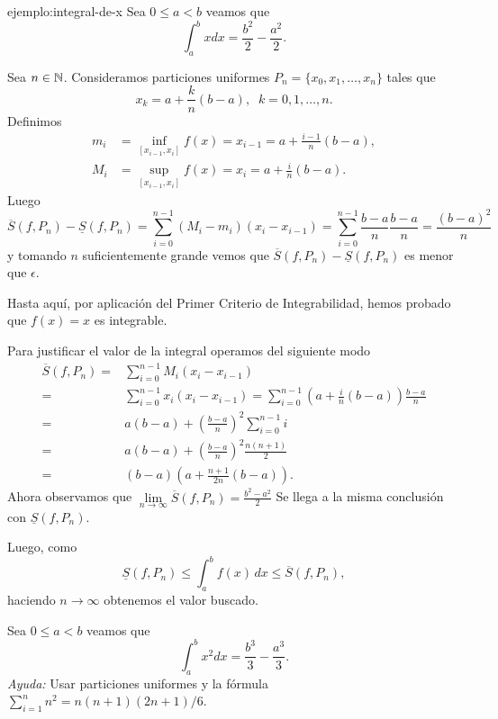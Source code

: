 \begin{ejemplo}{ejemplo:integral-de-x} Sea $0\leq a<b$ veamos que 
\[
 \int_a^b x dx=\frac{b^2}{2}-\frac{a^2}{2}.
\]
\begin{demo}
Sea $n \in \mathbb{N}$.
Consideramos particiones uniformes $P_n=\{x_0,x_1,\ldots,x_n\}$ tales que
\[x_k=a+\frac{k}{n}(b-a),\;\;  k=0,1,\ldots,n.\]
Definimos
\[\begin{split}
m_i&=\inf\limits_{[x_{i-1},x_i]}f(x)=x_{i-1}=a+\frac{i-1}{n}(b-a),
\\
M_i&=\sup\limits_{[x_{i-1},x_i]}f(x)=x_{i}=a+\frac{i}{n}(b-a).
\end{split}\]
Luego
\[
\overline{S}(f,P_n)-\underline{S}(f,P_n)=
\sum\limits_{i=0}^{n-1} (M_i-m_i)(x_i-x_{i-1})=
\sum\limits_{i=0}^{n-1}  
\frac{b-a}{n}\frac{b-a}{n}=\frac{(b-a)^2}{n}
\]
y tomando $n$ suficientemente grande vemos que $\overline{S}(f,P_n)-\underline{S}(f,P_n)$ es menor que $\epsilon$.

Hasta aqu\'i, por aplicaci\'on del Primer Criterio de Integrabilidad,  hemos probado que $f(x)=x$ es integrable. 

Para justificar el valor de la integral operamos del siguiente modo
\[
\begin{split}
\overline{S}(f,P_n)=&
\sum\limits_{i=0}^{n-1} M_i(x_i-x_{i-1})
\\
=&\sum\limits_{i=0}^{n-1} x_i(x_i-x_{i-1})=\sum\limits_{i=0}^{n-1}
\left(a+\frac{i}{n}(b-a) \right)\frac{b-a}{n}
\\
=&a(b-a)+\left(\frac{b-a}{n} \right)^2\sum\limits_{i=0}^{n-1} i
\\
=& a(b-a)+\left(\frac{b-a}{n} \right)^2 \frac{n(n+1)}{2}
\\
=&(b-a)\left(a+\frac{n+1}{2n} (b-a)\right).
\end{split}
\]
Ahora observamos que 
$\lim\limits_{n \to \infty} \overline{S}(f,P_n)=\frac{b^2-a^2}{2}$
Se llega a la misma conclusi\'on con $\underline{S}(f,P_n)$.

Luego, como 
\[
\underline{S}(f,P_n)\leq \int_a^b f(x)\,dx \leq \overline{S}(f,P_n),
\]
haciendo $n \to \infty$ obtenemos el valor buscado.
\end{demo}



\end{ejemplo}


\begin{ejercicio}{} Sea $0\leq a<b$ veamos que 
\[
 \int_a^b x^2 dx=\frac{b^3}{3}-\frac{a^3}{3}.
\]
{\em Ayuda:} Usar particiones uniformes y la fórmula $\sum_{i=1}^nn^2= n(n+1)(2n+1)/6$.
\end{ejercicio}

